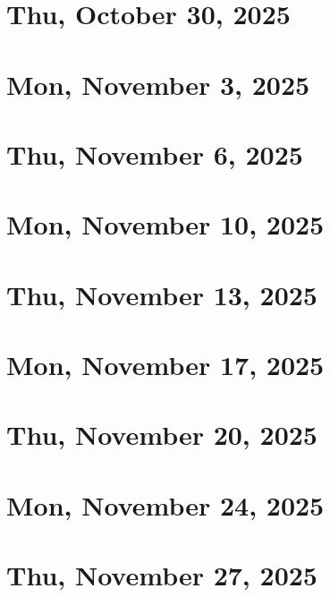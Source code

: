 \documentclass[a4paper]{report}
\institute{Technion}
\date{Based on lectures by \profloc{} in 2025--26
\\ Notes created by Daniel Haim Breger
\\~\\ Updated \today}
\begin{document}
\renewcommand\thepage{Title}
\maketitle
\renewcommand\thepage{Preface}


\newpage
\pagestyle{plain}
\tableofcontents
\newpage
\pagestyle{head}

\chapter{Thu, October 30, 2025}


\chapter{Mon, November 3, 2025}


\chapter{Thu, November 6, 2025}


\chapter{Mon, November 10, 2025}


\chapter{Thu, November 13, 2025}


\chapter{Mon, November 17, 2025}


\chapter{Thu, November 20, 2025}


\chapter{Mon, November 24, 2025}


\chapter{Thu, November 27, 2025}

\end{document}
